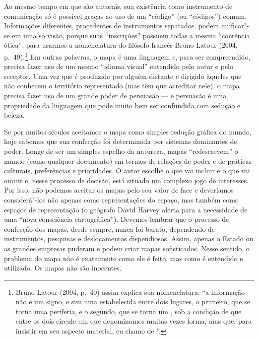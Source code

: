 Ao mesmo tempo em que são autorais, sua existência como instrumento de
comunicação só é possível graças ao uso de um ``código'' (ou
``códigos'') comum. Informações diferentes, procedentes de instrumentos
separados, podem unificar"-se em uma só visão, porque suas ``inscrições''
possuem todas a mesma ``coerência ótica'', para usarmos a nomenclatura
do filósofo francês Bruno Latour (2004, p.~49).\footnote{Bruno Latour
  (2004, p.~40) assim explica sua nomenclatura: ``a informação não é um
  signo, e sim uma {} estabelecida entre dois lugares, o
  primeiro, que se torna uma periferia, e o segundo, que se torna um
  {}, sob a condição de que entre os dois circule um
  {} que denominamos muitas vezes forma, mas que, para
  insistir em seu aspecto material, eu chamo de {}''.} Em
outras palavras, o mapa é uma linguagem e, para ser compreendido,
precisa fazer uso de um mesmo ``idioma visual'' entendido pelo autor e
pelo receptor. Uma vez que é produzido por alguém distante e dirigido
àqueles que não conhecem o território representado (mas têm que
acreditar nele), o mapa precisa fazer uso de um grande poder de
persuasão --- e persuasão é uma propriedade da linguagem que pode muito
bem ser confundida com sedução e beleza.

Se por muitos séculos aceitamos o mapa como simples redução gráfica do
mundo, hoje sabemos que sua confecção foi determinada por sistemas
dominantes de poder. Longe de ser um simples espelho da natureza, mapas
``redescrevem'' o mundo (como qualquer documento) em termos de relações
de poder e de práticas culturais, preferências e prioridades. O autor
escolhe o que vai incluir e o que vai omitir e, nesse processo de
decisão, está situado um complexo jogo de interesses. Por isso, não
podemos aceitar os mapas pelo seu valor de face e deveríamos
considerá"-los não apenas como representações do espaço, mas também como
espaços de representação (o geógrafo David Harvey alerta para a
necessidade de uma ``nova consciência cartográfica''). Devemos lembrar
que o processo de confecção dos mapas, desde sempre, nunca foi barato,
dependendo de instrumentos, pesquisas e deslocamentos dispendiosos.
Assim, apenas o Estado ou as grandes empresas puderam e podem criar
mapas sofisticados. Nesse sentido, o problema do mapa não é exatamente
como ele é feito, mas como é entendido e utilizado. Os mapas não são
inocentes.

